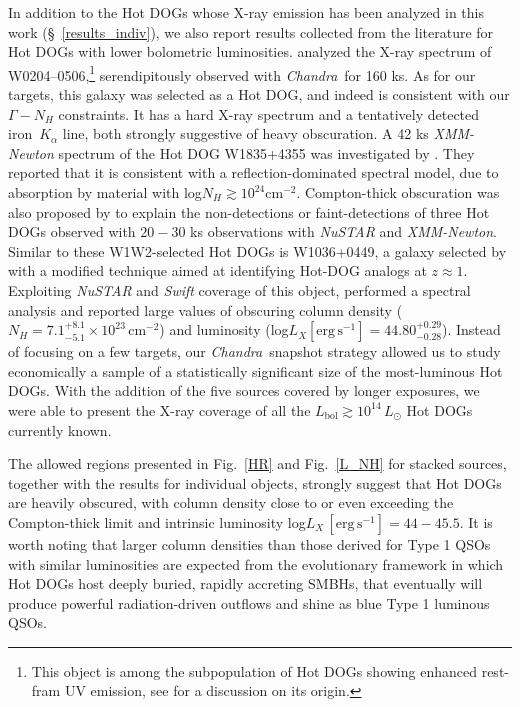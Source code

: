 \documentclass[useAMS,usenatbib]{mnras}
\newcommand*{\lunit}{\ensuremath{\mathrm{erg\,s^{-1}}}}
\newcommand*{\chandra}{\textit{Chandra}}
\newcommand*{\nhunits}{\mathrm{cm^{-2}}}
\begin{document}
In addition to the Hot DOGs whose X-ray emission has been analyzed in this work (\S~\ref{results_indiv}), we also report results collected from the literature for Hot DOGs with lower bolometric luminosities.
\cite{Assef16} analyzed the X-ray spectrum of W0204--0506,\footnote{This object is among the subpopulation of Hot DOGs showing enhanced rest-fram UV emission, see \cite{Assef15} for a discussion on its origin.} serendipitously observed with \chandra\, for 160 ks. As for our targets, this galaxy was selected as a Hot DOG, and indeed is consistent with our $\Gamma-N_H$ constraints. It has a hard X-ray spectrum and a tentatively detected iron~$K_\alpha$ line, both strongly suggestive of heavy obscuration.  A 42 ks \textit{XMM-Newton} spectrum of the Hot DOG W1835+4355 was investigated by \cite{Piconcelli15}. They reported that it is consistent with a reflection-dominated spectral model, due to absorption by material with log$N_H\gtrsim10^{24}\nhunits$. Compton-thick obscuration was also proposed by \cite{Stern14} to explain the non-detections or faint-detections of three Hot DOGs observed with $20-30$ ks observations with \mbox{\textit{NuSTAR}} and \textit{XMM-Newton}. 
Similar to these W1W2-selected Hot DOGs is W1036+0449, a galaxy selected by \cite{RicciC17} with a modified technique aimed at identifying Hot-DOG analogs at $z\approx1$. Exploiting \textit{NuSTAR} and \textit{Swift} coverage of this object, \cite{RicciC17} performed a spectral analysis and reported large values of obscuring column density ($N_H=7.1^{+8.1}_{-5.1}\times10^{23}\,\nhunits$) and luminosity (log$L_X[\lunit]=44.80^{+0.29}_{-0.28}$).
Instead of focusing on a few targets, our \chandra\, snapshot strategy allowed us to study economically a sample of a statistically significant size of the most-luminous Hot DOGs. With the addition of the five sources covered by longer exposures, we were able to present the X-ray coverage of all the $L_{\mathrm{bol}}\gtrsim10^{14}\,L_{\odot}$ Hot DOGs currently known.

The allowed regions presented in Fig.~\ref{HR}  and Fig.~\ref{L_NH} for stacked sources, together with the results for individual objects, strongly suggest that Hot DOGs are heavily obscured, with column density close to or even exceeding the Compton-thick limit and intrinsic luminosity log$L_X\,\mathrm{[\lunit]}=44-45.5$. It is worth noting that larger column densities than those derived for Type 1 QSOs with similar luminosities are expected from the evolutionary framework in which Hot DOGs host deeply buried, rapidly accreting SMBHs, that eventually will produce powerful radiation-driven outflows and shine as blue Type 1 luminous QSOs.
\end{document}
